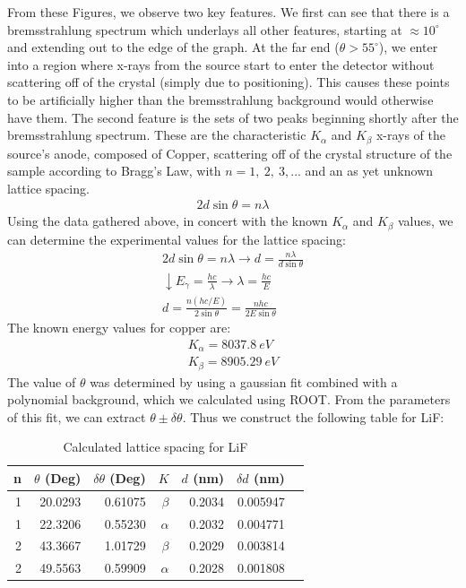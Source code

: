 \documentclass[%
 reprint,
 amsmath,amssymb,
 aps,
 pra,
]{revtex4-1}
\begin{document}
From these Figures, we observe two key features. We first can see that there is a bremsstrahlung spectrum which underlays all other features, starting at $\approx10^\circ$ and extending out to the edge of the graph. At the far end ($\theta > 55^\circ$), we enter into a region where x-rays from the source start to enter the detector without scattering off of the crystal (simply due to positioning). This causes these points to be artificially higher than the bremsstrahlung background would otherwise have them. The second feature is the sets of two peaks beginning shortly after the bremsstrahlung spectrum. These are the characteristic $K_\alpha$ and $K_\beta$ x-rays of the source's anode, composed of Copper, scattering off of the crystal structure of the sample according to Bragg's Law, with $n = 1,~2,~3,...$ and an as yet unknown lattice spacing. 
\begin{gather}
	2d\sin{\theta} = n \lambda
\end{gather}
Using the data gathered above, in concert with the known $K_\alpha$ and $K_\beta$ values, we can determine the experimental values for the lattice spacing:
\begin{gather}
	2d\sin{\theta} = n\lambda \rightarrow d = \frac{n\lambda}{d\sin{\theta}} \nonumber \\
	\downarrow E_\gamma = \frac{hc}{\lambda} \rightarrow \lambda = \frac{hc}{E} \nonumber \\
	d = \frac{n (hc/E)}{2 \sin{\theta}} = \frac{nhc}{2E\sin{\theta}}
\end{gather}
The known energy values for copper are:
\begin{gather}
	K_\alpha = 8037.8 ~eV \nonumber \\
	K_\beta = 8905.29 ~eV \nonumber
\end{gather}
The value of $\theta$ was determined by using a gaussian fit combined with a polynomial background, which we calculated using ROOT. From the parameters of this fit, we can extract $\theta \pm \delta \theta$. Thus we construct the following table for LiF:
\begin{table}[htbp]
	\begin{center}
	\begin{tabular}{|r|r|r|r|r|r|l|}
		\hline
		n & $\theta$ (Deg) & $\delta \theta$ (Deg) & $K$ &  $d$ (nm) & \multicolumn{1}{r|}{$\delta d$ (nm)} \\ \hline
		1 & 20.0293 & 0.61075 & $\beta$ &  0.2034 & 0.005947 \\ \hline
		1 & 22.3206 & 0.55230 & $\alpha$ &  0.2032 & 0.004771 \\ \hline
		2 & 43.3667 & 1.01729 & $\beta$ &  0.2029 & 0.003814 \\ \hline
		2 & 49.5563 & 0.59909 & $\alpha$ &  0.2028 & 0.001808 \\ \hline
	\end{tabular}
	\end{center}
	\caption{Calculated lattice spacing for LiF}
	\label{table:LiF}
\end{table}
\end{document}
